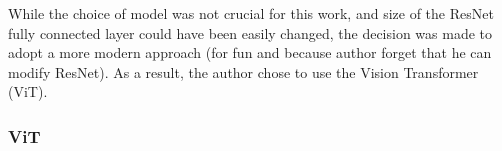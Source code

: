 While the choice of model was not crucial for this work, and size of the ResNet fully connected layer could have been easily changed, the decision was made to adopt a more modern approach (for fun and because author forget that he can modify ResNet). 
As a result, the author chose to use the Vision Transformer (ViT).

\subsubsection{ViT}





